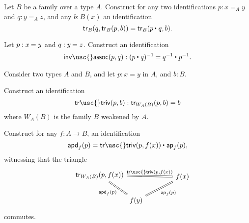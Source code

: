 \begin{exercises}
\item \label{ex:trans_concat}Let $B$ be a family over a type $A$. Construct for any two identifications $p:x=_A y$ and $q:y=_A z$, and any $b:B(x)$ an identification
\begin{equation*}
\mathsf{tr}_B(q,\mathsf{tr}_B(p,b))=\mathsf{tr}_B(\ct{p}{q},b).
\end{equation*}
\item \label{ex:inv_assoc}Let $p:\id{x}{y}$ and $q:\id{y}{z}$. Construct an identification
\begin{align*}
\mathsf{inv\usc{}assoc}(p,q):\id{(\ct{p}{q})^{-1}}{\ct{q^{-1}}{p^{-1}}}.
\end{align*}
\item \label{ex:trans_triv}Consider two types $A$ and $B$, and let $p:x=y$ in $A$, and $b:B$. 
\begin{subexenum}
\item Construct an identification
\begin{align*}
\mathsf{tr\usc{}triv}(p,b):\mathsf{tr}_{W_A(B)}(p,b)=b
\end{align*}
where $W_A(B)$ is the family $B$ weakened by $A$.
\item Construct for any $f:A\to B$, an identification 
\begin{equation*}
\apd{f}{p}=\ct{\mathsf{tr\usc{}triv}(p,f(x))}{\mathsf{ap}_f(p)},
\end{equation*}
witnessing that the triangle
\begin{equation*}
\begin{tikzcd}[trim right=(a),column sep=0em]
\mathsf{tr}_{W_A(B)}(p,f(x)) \arrow[dr,equals,swap,"\apd{f}{p}"] \arrow[rr,equals,"{\mathsf{tr\usc{}triv}(p,f(x))}"] & & |[alias=a,right]|f(x) \arrow[dl,equals,"\ap{f}{p}"] \\
& f(y) & \phantom{\mathsf{tr}_{W_A(B)}(p,f(x))}
\end{tikzcd}
\end{equation*}
commutes.
\end{subexenum}

\end{exercises}
